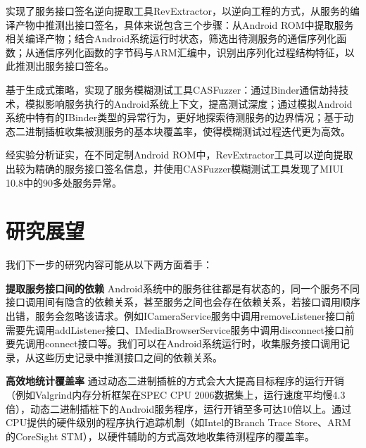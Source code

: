 \documentclass[winfonts,master,twoside]{njuthesis}
\begin{document}
实现了服务接口签名逆向提取工具RevExtractor，以逆向工程的方式，从服务的编译产物中推测出接口签名，具体来说包含三个步骤：从Android ROM中提取服务相关编译产物；结合Android系统运行时状态，筛选出待测服务的通信序列化函数；从通信序列化函数的字节码与ARM汇编中，识别出序列化过程结构特征，以此推测出服务接口签名。

基于生成式策略，实现了服务模糊测试工具CASFuzzer：通过Binder通信劫持技术，模拟影响服务执行的Android系统上下文，提高测试深度；通过模拟Android系统中特有的IBinder类型的异常行为，更好地探索待测服务的边界情况；基于动态二进制插桩收集被测服务的基本块覆盖率，使得模糊测试过程迭代更为高效。

经实验分析证实，在不同定制Android ROM中，RevExtractor工具可以逆向提取出较为精确的服务接口签名信息，并使用CASFuzzer模糊测试工具发现了MIUI 10.8中的90多处服务异常。

\section{研究展望}

我们下一步的研究内容可能从以下两方面着手：

\textbf{提取服务接口间的依赖} \quad Android系统中的服务往往都是有状态的，同一个服务不同接口调用间有隐含的依赖关系，甚至服务之间也会存在依赖关系，若接口调用顺序出错，服务会忽略该请求。例如ICameraService服务中调用removeListener接口前需要先调用addListener接口、IMediaBrowserService服务中调用disconnect接口前要先调用connect接口等。我们可以在Android系统运行时，收集服务接口调用记录，从这些历史记录中推测接口之间的依赖关系。

\textbf{高效地统计覆盖率} \quad 通过动态二进制插桩的方式会大大提高目标程序的运行开销（例如Valgrind内存分析框架在SPEC CPU 2006数据集上，运行速度平均慢4.3倍\cite{nethercote2007valgrind}），动态二进制插桩下的Android服务程序，运行开销至多可达10倍以上。通过CPU提供的硬件级别的程序执行追踪机制（如Intel的Branch Trace Store、ARM的CoreSight STM），以硬件辅助的方式高效地收集待测程序的覆盖率。



\end{document}

